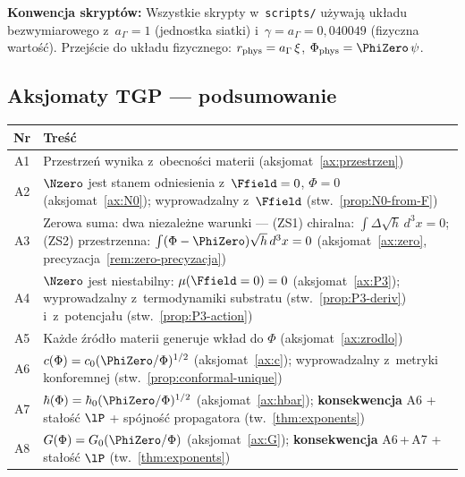 \medskip\noindent
\textbf{Konwencja skrypt\'ow:} Wszystkie skrypty w~\texttt{scripts/}
u\.zywaj\k{a} uk\l{}adu bezwymiarowego z~$a_\Gamma = 1$ (jednostka siatki)
i~$\gamma = a_\Gamma = 0{,}040049$ (fizyczna warto\'s\'c). Przej\'scie
do uk\l{}adu fizycznego: $r_{\rm phys} = a_\Gamma\,\xi$,
$\Phi_{\rm phys} = \PhiZero\,\psi$.

\subsection{Aksjomaty TGP --- podsumowanie}

\begin{center}
\begin{tabular}{@{}cp{12.5cm}@{}}
\toprule
\textbf{Nr} & \textbf{Tre\'s\'c} \\
\midrule
A1 & Przestrze\'n wynika z~obecno\'sci materii
     (aksjomat~\ref{ax:przestrzen}) \\
A2 & $\Nzero$ jest stanem odniesienia z~$\Ffield = 0$, $\Phi = 0$
     (aksjomat~\ref{ax:N0}); wyprowadzalny z~$\Ffield$
     (stw.~\ref{prop:N0-from-F}) \\
A3 & Zerowa suma: dwa niezale\.zne warunki ---
     (ZS1) chiralna: $\int\Delta\sqrt{h}\,d^3x = 0$;
     (ZS2) przestrzenna: $\int(\Phi-\PhiZero)\sqrt{h}\,d^3x = 0$
     (aksjomat~\ref{ax:zero}, precyzacja~\ref{rem:zero-precyzacja}) \\
A4 & $\Nzero$ jest niestabilny: $\mu(\Ffield=0) = 0$
     (aksjomat~\ref{ax:P3}); wyprowadzalny z~termodynamiki
     substratu (stw.~\ref{prop:P3-deriv}) i~z~potencja\l{}u
     (stw.~\ref{prop:P3-action}) \\
A5 & Ka\.zde \'zr\'od\l{}o materii generuje wk\l{}ad do $\Phi$
     (aksjomat~\ref{ax:zrodlo}) \\
A6 & $c(\Phi) = c_0(\PhiZero/\Phi)^{1/2}$
     (aksjomat~\ref{ax:c}); wyprowadzalny z~metryki konforemnej
     (stw.~\ref{prop:conformal-unique}) \\
A7 & $\hbar(\Phi) = \hbar_0(\PhiZero/\Phi)^{1/2}$
     (aksjomat~\ref{ax:hbar}); \textbf{konsekwencja} A6 + sta\l{}o\'s\'c
     $\lP$ + sp\'ojno\'s\'c propagatora (tw.~\ref{thm:exponents}) \\
A8 & $G(\Phi) = G_0(\PhiZero/\Phi)$
     (aksjomat~\ref{ax:G}); \textbf{konsekwencja} A6\,+\,A7 + sta\l{}o\'s\'c
     $\lP$ (tw.~\ref{thm:exponents}) \\
\bottomrule
\end{tabular}
\end{center}

